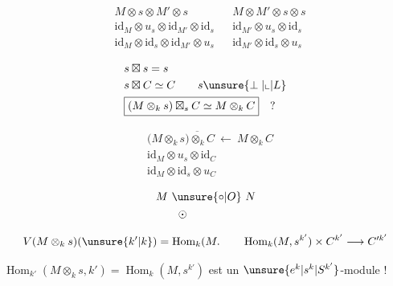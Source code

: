 \[
\begin{aligned}
&M\otimes s\otimes M'\otimes s&&M\otimes M'\otimes s\otimes s\\
&\mathrm{id}_M\otimes u_s\otimes\mathrm{id}_{M'}\otimes\mathrm{id}_s
 &&\mathrm{id}_{M'}\otimes u_s\otimes\mathrm{id}_s\\
&\mathrm{id}_M\otimes\mathrm{id}_s\otimes\mathrm{id}_{M'}\otimes u_s
 &&\mathrm{id}_{M'}\otimes\mathrm{id}_s\otimes u_s
\end{aligned}
\]

\[
\begin{aligned}
&s\boxtimes s=s\\
&s\boxtimes C\simeq C\qquad s\mathbin{\unsure{\perp|{\llcorner}|L}}\\
&\boxed{(M\otimes_k s)\boxtimes_s C\simeq M\otimes_k C}\quad?
\end{aligned}
\]

\[
\begin{aligned}
&\bigl(M\otimes_k\overline{s)\otimes_k C}\ \longleftarrow\ M\otimes_k C\\
&\mathrm{id}_M\otimes u_s\otimes\mathrm{id}_C\\
&\mathrm{id}_M\otimes\mathrm{id}_s\otimes u_C
\end{aligned}
\]

\[
\begin{aligned}
&M\ \unsure{\circ|O}\ N\\
&\qquad\odot
\end{aligned}
\]



\[
V(M\otimes_k s)(\unsure{k'|k})=\operatorname{Hom}_k(M.\qquad
\operatorname{Hom}_k(M,s^{k'})\times C^{k'}\longrightarrow C'^{k'}
\]


$\operatorname{Hom}_{k'}(M\otimes_k s,k')=\operatorname{Hom}_k(M,s^{k'})$ est un $\unsure{e^k|s^k|S^{k'}}$-module !


